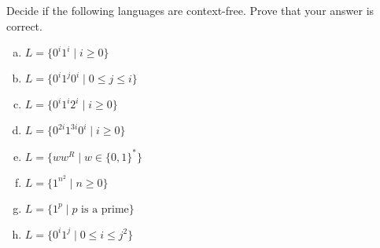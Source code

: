 \documentclass[a4paper,12pt]{amsart}
\begin{document}
\medskip\begin{problem}

    Decide if the following languages are context-free. Prove that your answer is correct.

    \medskip
    
    \begin{enumerate}[(a)]
        \setlength\itemsep{6pt}
        \item $L=\{0^i1^i\mid i\geq 0\}$        
        \item $L=\{0^i1^j0^i\mid 0\leq j\leq i\}$
        \item $L=\{0^i1^i2^i\mid i\geq 0\}$
        \item $L=\{0^{2i}1^{3i}0^i\mid i\geq 0\}$        
        \item $L=\{ww^R\mid w\in \{0,1\}^*\}$        
        \item $L=\{1^{n^2}\mid n\geq 0\}$        
        \item $L=\{1^p\mid p \text{ is a prime}\}$
        \item $L=\{0^i1^{j}\mid 0\leq i\leq j^2\}$
    \end{enumerate}

\end{problem}
\end{document}

